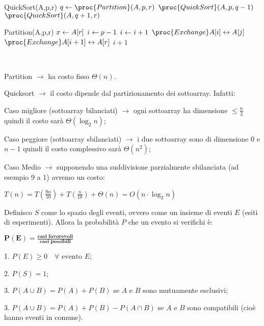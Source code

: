 \documentclass[8pt]{extarticle}
\begin{document}
\begin{formulario}
		\begin{code}{QuickSort(A,p,r)}
\li {}
	\li $q \la \proc{Partition}(A,p,r)$
	\li $\proc{QuickSort}(A,p,q-1)$
	\li $\proc{QuickSort}(A,q+1,r)$
\End
		\end{code}
		\begin{code}{Partition(A,p,r)}
\li $x\leftarrow A[r]$
\li $i\leftarrow p-1$
\li {}
	\li {}
		\li $i \leftarrow i+1$
		\li	 $\proc{Exchange }A[i] \sse A[j]$
	\End
\End
\li $\proc{Exchange } A[i+1]\sse A[r]$
\li \Return $i+1$	
		\end{code}
\\
		\begin{descr}{1}
\item[Partition] $\rightarrow$ ha costo fisso $\Theta(n)$.
\item[Quicksort] $\rightarrow$ il costo dipende dal partizionamento dei sottoarray. Infatti:
			\begin{descr}{0}
\item[Caso migliore] (sottoarray bilanciati) $\rightarrow$ ogni sottoarray ha dimensione $\leq \frac{n}{2}$ quindi il costo sarà $\Theta(\log_2 n)$;
\item[Caso peggiore] (sottoarray sbilanciati) $\rightarrow$ i due sottoarray sono di dimensione $0$ e $n-1$ quindi il costo complessivo sarà $\Theta(n^2)$;
\item[Caso Medio] $\rightarrow$ supponendo una suddivisione parzialmente sbilanciata (ad esempio 9 a 1) avremo un costo:
				\begin{tcenter}
$T(n)=T(\frac{9n}{10})+T(\frac{n}{10})+\Theta(n)=O(n\cdot \log_2 n)$
				\end{tcenter}
			\end{descr}
		\end{descr}
\myRule

	\begin{tcenter}
	\end{tcenter}
Definisco $S$ come lo spazio degli eventi, ovvero come un insieme di eventi $E$ (esiti di esperimenti). Allora la probabilità $P$ che un evento si verifichi è:  
		\begin{tcenter}
		$\bm{P(E)=\frac{\text{casi favorevoli}}{\text{casi possibili}}}$
		\end{tcenter}
	\begin{descr}{1}
\item[1.] $P(E)\geq 0 \quad \forall \text{ evento }E$;
\item[2.] $P(S)=1$;
\item[3.] $P(A \cup B)=P(A)+P(B)$ \quad se $A$ e $B$ sono mutuamente esclusivi;
\item[3.] $P(A \cup B)=P(A)+P(B)-P(A\cap B)$ \quad se $A$ e $B$ sono compatibili (cioè hanno eventi in comune).
	\end{descr}
	\begin{descr}{1}
	

\end{descr}
\end{formulario}
\end{document}
